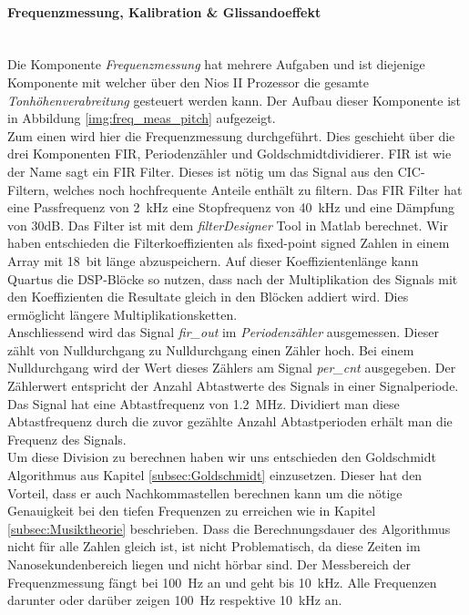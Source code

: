 \newpage

\paragraph{Frequenzmessung, Kalibration \& Glissandoeffekt}\mbox{}\\

Die Komponente \textit{Frequenzmessung} hat mehrere Aufgaben und ist diejenige Komponente mit welcher über den Nios II Prozessor die gesamte \textit{Tonhöhenverabreitung} gesteuert werden kann. Der Aufbau dieser Komponente ist in Abbildung \ref{img:freq_meas_pitch} aufgezeigt.\\
Zum einen wird hier die Frequenzmessung durchgeführt. Dies geschieht über die drei Komponenten FIR, Periodenzähler und Goldschmidtdividierer. FIR ist wie der Name sagt ein FIR Filter. Dieses ist nötig um das Signal aus den CIC-Filtern, welches noch hochfrequente Anteile enthält zu filtern. Das FIR Filter hat eine Passfrequenz von \SI{2}{kHz} eine Stopfrequenz von \SI{40}{kHz} und eine Dämpfung von 30dB. Das Filter ist mit dem \textit{filterDesigner} Tool in Matlab berechnet. Wir haben entschieden die Filterkoeffizienten als fixed-point signed Zahlen in einem Array mit \SI{18}{bit} länge abzuspeichern. Auf dieser Koeffizientenlänge kann Quartus die DSP-Blöcke so nutzen, dass nach der Multiplikation des Signals mit den Koeffizienten die Resultate gleich in den Blöcken addiert wird. Dies ermöglicht längere Multiplikationsketten. \cite{Cyclone_V}\\
Anschliessend wird das Signal \textit{fir\_out} im \textit{Periodenzähler} ausgemessen. Dieser zählt von Nulldurchgang zu Nulldurchgang einen Zähler hoch. Bei einem Nulldurchgang wird der Wert dieses Zählers am Signal \textit{per\_cnt} ausgegeben. Der Zählerwert entspricht der Anzahl Abtastwerte des Signals in einer Signalperiode. \\
Das Signal hat eine Abtastfrequenz von \SI{1.2}{MHz}. Dividiert man diese Abtastfrequenz durch die zuvor gezählte Anzahl Abtastperioden erhält man die Frequenz des Signals.\\ Um diese Division zu berechnen haben wir uns entschieden den Goldschmidt Algorithmus aus Kapitel \ref{subsec:Goldschmidt} einzusetzen. Dieser hat den Vorteil, dass er auch Nachkommastellen berechnen kann um die nötige Genauigkeit bei den tiefen Frequenzen zu erreichen wie in Kapitel \ref{subsec:Musiktheorie} beschrieben. Dass die Berechnungsdauer des Algorithmus nicht für alle Zahlen gleich ist, ist nicht Problematisch, da diese Zeiten im Nanosekundenbereich liegen und nicht hörbar sind. Der Messbereich der Frequenzmessung fängt bei \SI{100}{Hz} an und geht bis \SI{10}{kHz}. Alle Frequenzen darunter oder darüber zeigen \SI{100}{Hz} respektive \SI{10}{kHz} an.

